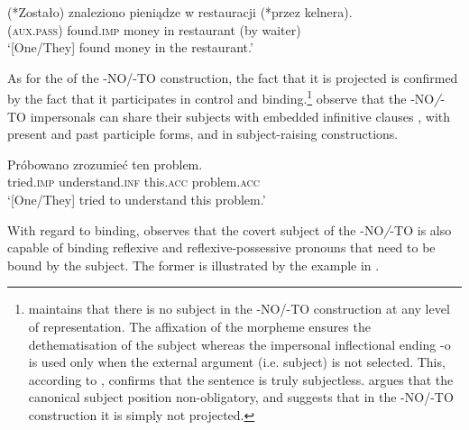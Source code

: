 \documentclass[output=paper]{LSP/langsci}
\begin{document}
\ea\label{ex:6.krzek}
  \gll   (*Zostało)      znaleziono         pieniądze w  restauracji (*przez kelnera). \\
    (\textsc{aux.pass})  found.\textsc{imp} money     in restaurant    (by   waiter)\\
\glt ‘[One/They] found money in the restaurant.’
\z

As for the  of the -NO/-TO construction, the fact that it is projected is confirmed by the fact that it participates in control and binding.\footnote{\citet{Babby1998} maintains that there is no subject in the -NO/-TO construction at any level of representation. The affixation of the  morpheme ensures the dethematisation of the subject whereas the impersonal inflectional ending -o is used only when the external argument (i.e. subject) is not selected. This, according to \citet{Babby1998}, confirms that the sentence is truly subjectless. \citet{Babby1998} argues that the canonical subject position non-obligatory, and suggests that in the -NO/-TO construction it is simply not projected.} \citet{BondarukEtAl2003} observe that the -NO\textit{/}{}-TO\textit{} impersonals can share their subjects with embedded infinitive clauses , with present and past participle forms, and in subject-raising constructions.

\ea%
    \label{ex:7.krzek}

    \gll Próbowano          zrozumieć    ten    problem.\\
         tried.\textsc{imp} understand.\textsc{inf}  this.\textsc{acc} problem.\textsc{acc} \\
\glt ‘[One/They] tried to understand this problem.'
\z

With regard to binding, \citet{Kibort2004} observes that the covert subject of the -NO\textit{/}{}-TO is also capable of binding reflexive and reflexive-possessive pronouns that need to be bound by the subject. The former is illustrated by the example in .

\z

\end{document}
